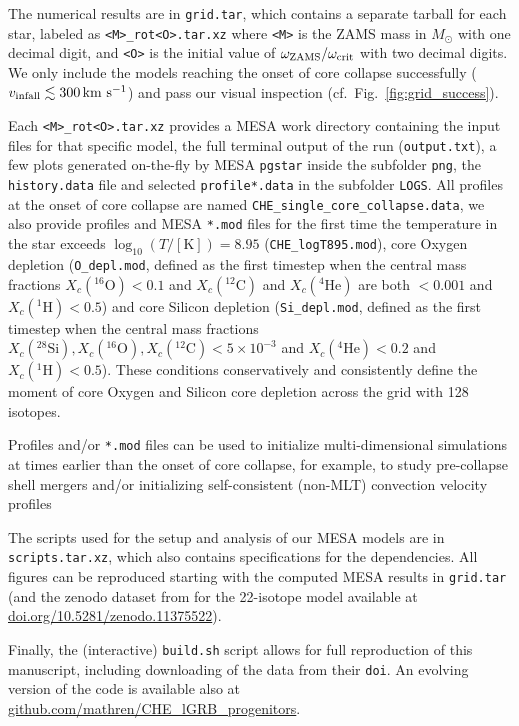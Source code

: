 \documentclass[%
trackchanges,twocolumn]{aastex701}
\DeclareRobustCommand{\Figref}[1]{Fig.~\ref{#1}}
\begin{document}
The numerical results are in \texttt{grid.tar}, which contains a
separate tarball for each star, labeled as \texttt{<M>\_rot<O>.tar.xz}
where \texttt{<M>} is the ZAMS mass in $M_{\odot}$ with one decimal
digit, and \texttt{<O>} is the initial value of
$\omega_{\rm ZAMS}/\omega_{\rm crit}$ with two decimal digits. We only
include the models reaching the onset of core collapse successfully
($v_{\rm infall}\lesssim300\,\mathrm{km\ s^{-1}}$) and pass our visual
inspection (cf.~\Figref{fig:grid_success}).

Each \texttt{<M>\_rot<O>.tar.xz} provides a \textsc{MESA} work
directory containing the input files for that specific model, the full
terminal output of the run (\texttt{output.txt}), a few plots
generated on-the-fly by \textsc{MESA} \texttt{pgstar} inside the
subfolder \texttt{png}, the \texttt{history.data} file and selected
\texttt{profile*.data} in the subfolder \texttt{LOGS}. All profiles at
the onset of core collapse are named
\texttt{CHE\_single\_core\_collapse.data}, we also provide profiles
and \textsc{MESA} \texttt{*.mod} files for the first time the
temperature in the star exceeds $\log_{10}(T/\mathrm{[K]})=8.95$
(\texttt{CHE\_logT895.mod}), core Oxygen depletion
(\texttt{O\_depl.mod}, defined as the first timestep when the central
mass fractions $X_{c}(^{16}\mathrm{O})<0.1$ and
$X_{c}(^{12}\mathrm{C})$ and $X_{c}(^{4}\mathrm{He})$ are both
$<0.001$ and $X_{c}(^{1}\mathrm{H})<0.5$) and core Silicon depletion
(\texttt{Si\_depl.mod}, defined as the first timestep when the central
mass fractions
$X_{c}(^{28}\mathrm{Si}), X_{c}(^{16}\mathrm{O}), X_{c}(^{12}\mathrm{C})<5 \times 10^{-3}$
and $X_{c}(^{4}\mathrm{He})<0.2$ and $X_{c}(^{1}\mathrm{H})<0.5$).
These conditions conservatively and consistently define the moment of
core Oxygen and Silicon core depletion across the grid with
128 isotopes.

Profiles and/or \texttt{*.mod} files can be used to initialize
multi-dimensional simulations at times earlier than the onset of core
collapse, for example, to study pre-collapse shell mergers and/or
initializing self-consistent (non-MLT) convection velocity profiles
\cite[e.g.,][]{cote:20, yadav:20, fields:22, issa:25, griffiths:26,
  issa:26}

The scripts used for the setup and analysis of our \textsc{MESA}
models are in \texttt{scripts.tar.xz}, which also contains
specifications for the dependencies. All figures can be reproduced
starting with the computed \textsc{MESA} results in \texttt{grid.tar}
(and the zenodo dataset \citep{10.5281/zenodo.11375522} from \citealt{renzo:24}
for the 22-isotope model available at \href{https://doi.org/10.5281/zenodo.11375522}{doi.org/10.5281/zenodo.11375522}).

Finally, the (interactive) \texttt{build.sh} script allows for full
reproduction of this manuscript, including downloading of the data
from their \texttt{doi}. An evolving version of the code is available
also at
\href{https://github.com/mathren/CHE_LGRB_progenitors}{github.com/mathren/CHE\_lGRB\_progenitors}.



\end{document}
